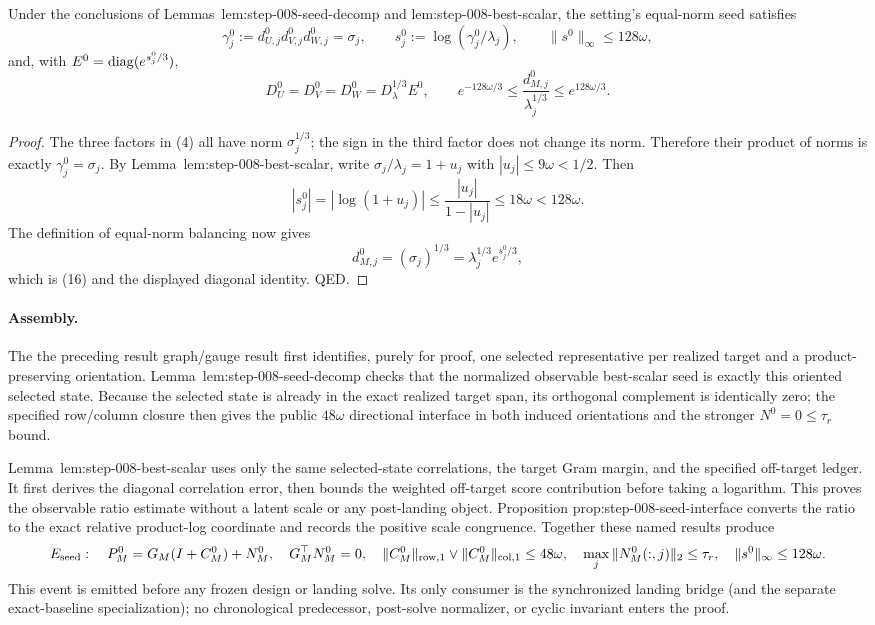 \begin{proposition}\label{prop:step-008-seed-interface}
Under the conclusions of
Lemmas~lem:step-008-seed-decomp and lem:step-008-best-scalar, the
setting's equal-norm seed satisfies
\[
 \gamma_j^0:=d_{U,j}^0d_{V,j}^0d_{W,j}^0=\sigma_j,\qquad
 s_j^0:=\log(\gamma_j^0/\lambda_j),\qquad
 \|s^0\|_\infty\le128\omega, \tag{15}
\]
and, with $E^0={\rm diag}(e^{s_j^0/3})$,
\[
 D_U^0=D_V^0=D_W^0=D_\lambda^{1/3}E^0,\qquad
 e^{-128\omega/3}\le\frac{d_{M,j}^0}{\lambda_j^{1/3}}
 \le e^{128\omega/3}. \tag{16}
\]

\begin{proof}

The three factors in (4) all have norm $\sigma_j^{1/3}$; the sign in the
third factor does not change its norm. Therefore their product of norms is
exactly $\gamma_j^0=\sigma_j$. By Lemma~lem:step-008-best-scalar, write
$\sigma_j/\lambda_j=1+u_j$ with $|u_j|\le9\omega<1/2$. Then
\[
 |s_j^0|=|\log(1+u_j)|
 \le\frac{|u_j|}{1-|u_j|}
 \le18\omega<128\omega. \tag{17}
\]
The definition of equal-norm balancing now gives
\[
 d_{M,j}^0=(\sigma_j)^{1/3}
 =\lambda_j^{1/3}e^{s_j^0/3},
\]
which is (16) and the displayed diagonal identity. QED.

\end{proof}
\end{proposition}
\paragraph{Assembly.}

The the preceding result graph/gauge result first identifies, purely for proof,
one selected representative per realized target and a product-preserving
orientation. Lemma~lem:step-008-seed-decomp checks that the normalized
observable best-scalar seed is exactly this oriented selected state. Because
the selected state is already in the exact realized target span, its
orthogonal complement is identically zero; the specified row/column closure
then gives the public $48\omega$ directional interface in both induced
orientations and the stronger $N^0=0\le\tau_r$ bound.

Lemma~lem:step-008-best-scalar uses only the same selected-state correlations,
the target Gram margin, and the specified off-target ledger. It first derives
the diagonal correlation error, then bounds the weighted off-target score
contribution before taking a logarithm. This proves the observable ratio
estimate without a latent scale or any post-landing object. Proposition
prop:step-008-seed-interface converts the ratio to the exact relative
product-log coordinate and records the positive scale congruence. Together
these named results produce
\[
 E_{\rm seed}:\quad
 P_M^0=G_M(I+C_M^0)+N_M^0,\quad G_M^\top N_M^0=0,\quad
 \|C_M^0\|_{\rm row,1}\vee\|C_M^0\|_{\rm col,1}\le48\omega,\quad
 \max_j\|N_M^0(:,j)\|_2\le\tau_r,\quad
 \|s^0\|_\infty\le128\omega.
\]
This event is emitted before any frozen design or landing solve. Its only
consumer is the synchronized landing bridge (and the separate exact-baseline
specialization); no chronological predecessor, post-solve normalizer, or
cyclic invariant enters the proof.

